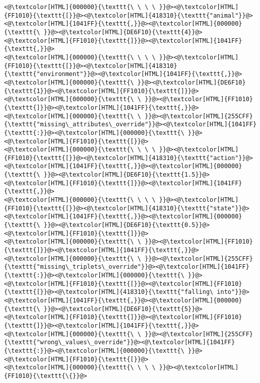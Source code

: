 \begin{lstlisting}
<@\textcolor[HTML]{000000}{\texttt{\ \ \ \ }}@><@\textcolor[HTML]{FF1010}{\texttt{[}}@><@\textcolor[HTML]{418310}{\texttt{"animal"}}@><@\textcolor[HTML]{1041FF}{\texttt{,}}@><@\textcolor[HTML]{000000}{\texttt{\ }}@><@\textcolor[HTML]{DE6F10}{\texttt{4}}@><@\textcolor[HTML]{FF1010}{\texttt{]}}@><@\textcolor[HTML]{1041FF}{\texttt{,}}@>
<@\textcolor[HTML]{000000}{\texttt{\ \ \ \ }}@><@\textcolor[HTML]{FF1010}{\texttt{[}}@><@\textcolor[HTML]{418310}{\texttt{"environment"}}@><@\textcolor[HTML]{1041FF}{\texttt{,}}@><@\textcolor[HTML]{000000}{\texttt{\ }}@><@\textcolor[HTML]{DE6F10}{\texttt{1}}@><@\textcolor[HTML]{FF1010}{\texttt{]}}@>
<@\textcolor[HTML]{000000}{\texttt{\ \ }}@><@\textcolor[HTML]{FF1010}{\texttt{]}}@><@\textcolor[HTML]{1041FF}{\texttt{,}}@>
<@\textcolor[HTML]{000000}{\texttt{\ \ }}@><@\textcolor[HTML]{255CFF}{\texttt{"missing\_attributes\_override"}}@><@\textcolor[HTML]{1041FF}{\texttt{:}}@><@\textcolor[HTML]{000000}{\texttt{\ }}@><@\textcolor[HTML]{FF1010}{\texttt{[}}@>
<@\textcolor[HTML]{000000}{\texttt{\ \ \ \ }}@><@\textcolor[HTML]{FF1010}{\texttt{[}}@><@\textcolor[HTML]{418310}{\texttt{"action"}}@><@\textcolor[HTML]{1041FF}{\texttt{,}}@><@\textcolor[HTML]{000000}{\texttt{\ }}@><@\textcolor[HTML]{DE6F10}{\texttt{1.5}}@><@\textcolor[HTML]{FF1010}{\texttt{]}}@><@\textcolor[HTML]{1041FF}{\texttt{,}}@>
<@\textcolor[HTML]{000000}{\texttt{\ \ \ \ }}@><@\textcolor[HTML]{FF1010}{\texttt{[}}@><@\textcolor[HTML]{418310}{\texttt{"state"}}@><@\textcolor[HTML]{1041FF}{\texttt{,}}@><@\textcolor[HTML]{000000}{\texttt{\ }}@><@\textcolor[HTML]{DE6F10}{\texttt{0.5}}@><@\textcolor[HTML]{FF1010}{\texttt{]}}@>
<@\textcolor[HTML]{000000}{\texttt{\ \ }}@><@\textcolor[HTML]{FF1010}{\texttt{]}}@><@\textcolor[HTML]{1041FF}{\texttt{,}}@>
<@\textcolor[HTML]{000000}{\texttt{\ \ }}@><@\textcolor[HTML]{255CFF}{\texttt{"missing\_triplets\_override"}}@><@\textcolor[HTML]{1041FF}{\texttt{:}}@><@\textcolor[HTML]{000000}{\texttt{\ }}@><@\textcolor[HTML]{FF1010}{\texttt{[}}@><@\textcolor[HTML]{FF1010}{\texttt{[}}@><@\textcolor[HTML]{418310}{\texttt{"falling\ into"}}@><@\textcolor[HTML]{1041FF}{\texttt{,}}@><@\textcolor[HTML]{000000}{\texttt{\ }}@><@\textcolor[HTML]{DE6F10}{\texttt{5}}@><@\textcolor[HTML]{FF1010}{\texttt{]}}@><@\textcolor[HTML]{FF1010}{\texttt{]}}@><@\textcolor[HTML]{1041FF}{\texttt{,}}@>
<@\textcolor[HTML]{000000}{\texttt{\ \ }}@><@\textcolor[HTML]{255CFF}{\texttt{"wrong\_values\_override"}}@><@\textcolor[HTML]{1041FF}{\texttt{:}}@><@\textcolor[HTML]{000000}{\texttt{\ }}@><@\textcolor[HTML]{FF1010}{\texttt{[}}@>
<@\textcolor[HTML]{000000}{\texttt{\ \ \ \ }}@><@\textcolor[HTML]{FF1010}{\texttt{\{}}@>

\end{lstlisting}
